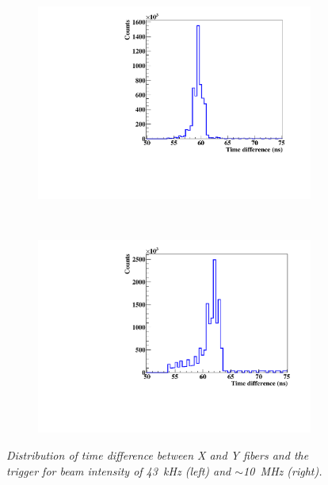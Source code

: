 \documentclass[a4paper,11pt]{article}
\begin{document}
\begin{figure}[H]
\centering
    \begin{subfigure}{0.49\textwidth} \centering \includegraphics[width=\textwidth]{figures/time_coinc_43kHz_August.pdf} \caption{} \label{fig:Time_43kHz}
    \end{subfigure}
    ~
    \begin{subfigure}{0.49\textwidth} \centering \includegraphics[width=\textwidth]{figures/time_coinc_10MHz_August.pdf} \caption{} \label{fig:Time_10MHz}
    \end{subfigure}
\caption{\small{\textit{Distribution of time difference between X and Y fibers and the trigger for beam intensity of 43~kHz (left) and $\sim$10~MHz (right).}}}
\label{fig:Time_coinc}
\end{figure}
\end{document}
